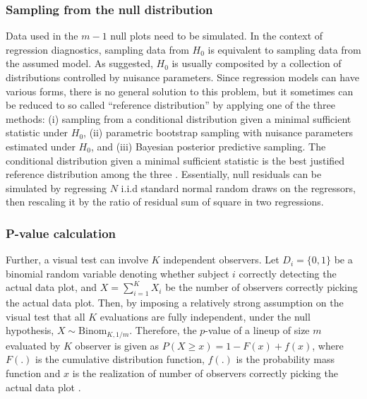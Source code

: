 \documentclass[]{interact}
\theoremstyle{plain}%
\theoremstyle{definition}
\theoremstyle{remark}
\begin{document}
\hypertarget{sampling-from-the-null-distribution}{%
\subsubsection{Sampling from the null
distribution}\label{sampling-from-the-null-distribution}}

Data used in the \(m - 1\) null plots need to be simulated. In the
context of regression diagnostics, sampling data from \(H_0\) is
equivalent to sampling data from the assumed model. As
\citet{buja_statistical_2009} suggested, \(H_0\) is usually composited
by a collection of distributions controlled by nuisance parameters.
Since regression models can have various forms, there is no general
solution to this problem, but it sometimes can be reduced to so called
``reference distribution'' by applying one of the three methods: (i)
sampling from a conditional distribution given a minimal sufficient
statistic under \(H_0\), (ii) parametric bootstrap sampling with
nuisance parameters estimated under \(H_0\), and (iii) Bayesian
posterior predictive sampling. The conditional distribution given a
minimal sufficient statistic is the best justified reference
distribution among the three \citep{buja_statistical_2009}. Essentially,
null residuals can be simulated by regressing \(N\) i.i.d standard
normal random draws on the regressors, then rescaling it by the ratio of
residual sum of square in two regressions.

\hypertarget{p-value-calculation}{%
\subsubsection{P-value calculation}\label{p-value-calculation}}

Further, a visual test can involve \(K\) independent observers. Let
\(D_i = \{0,1\}\) be a binomial random variable denoting whether subject
\(i\) correctly detecting the actual data plot, and
\(X = \sum_{i=1}^{K}X_i\) be the number of observers correctly picking
the actual data plot. Then, by imposing a relatively strong assumption
on the visual test that all \(K\) evaluations are fully independent,
under the null hypothesis, \(X \sim \mathrm{Binom}_{K,1/m}\). Therefore,
the \(p\)-value of a lineup of size \(m\) evaluated by \(K\) observer is
given as \(P(X \geq x) = 1 - F(x) + f(x)\), where \(F(.)\) is the
cumulative distribution function, \(f(.)\) is the probability mass
function and \(x\) is the realization of number of observers correctly
picking the actual data plot \citep{majumder_validation_2013}.
\end{document}
